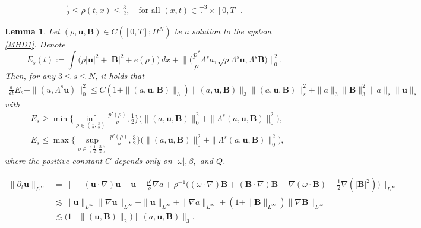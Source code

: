 \documentclass[10pt,a4paper]{amsart}
\newtheorem{lemma}{Lemma}
\def\b{ \mathbf{B} }
\def\u{ \mathbf{u} }
\begin{document}
\begin{equation}\begin{split}\label{pri-2}
		\frac{1}{2}\le \rho(t,x) \le \frac32, \quad \text{for all } (x,t)\in\mathbb T^3\times[0,T].
\end{split}\end{equation}

\begin{lemma}\label{lemma-pri1}
Let $(\rho,\u,\b) \in C([0, T];H^N)$ be a solution to the  system \eqref{MHD1}. Denote
$$E_s(t):=\int\Big(\rho|\u|^2+|\b|^2+e(\rho)\Big)\,dx+\Big\|\big(\frac{p'}{\rho}\Lambda^sa,\sqrt{\rho}\Lambda^s\u,\Lambda^s\b\big)\Big\|^2_0.$$ Then, for any $3\leq s\leq N$, it holds that
\begin{align}\label{pri-2-2}
\frac{d}{dt}E_s+
\|(u,\Lambda^s\u)\|_0^2\leq C(1+\|(a,\u,\b)\|_3)\|(a,\u,\b)\|_3\|(a,\u,\b)\|^2_s+
\|a\|_3\|\b\|^{2}_3\|a\|_s\|\u\|_s
\end{align}
with
\begin{equation}
\begin{split}\label{bu-2026-6-27-1}& E_s\geq\min\{\inf_{\rho\in(\frac12,\frac32)}\frac{p'(\rho)}{\rho},\frac12\}\big(\|(a,\u,\b)\|^2_0+\|\Lambda^s(a,\u,\b)\|^2_0\big),\\&E_s\leq\max\{\sup_{\rho\in(\frac12,\frac32)}\frac{p'(\rho)}{\rho},\frac32\}\big(\|(a,\u,\b)\|^2_0+\|\Lambda^s(a,\u,\b)\|^2_0\big),\end{split}\end{equation}
where the positive constant $C$ depends only on $|\omega|,\beta,$ and $Q$.
\end{lemma}

\begin{equation}\begin{split}\label{pri-5}
\|\partial_t\u\|_{L^\infty}&=\Big\|-(\u\cdot\nabla)\u-\u-\frac{p'}{\rho}\nabla a+\rho^{-1}\big((\omega\cdot \nabla) \b+(\b\cdot \nabla) \b-\nabla(\omega\cdot \b)-\frac12\nabla(|\b|^2)\big)\Big\|_{L^\infty}\\
&\lesssim\|\u\|_{L^\infty}\|\nabla\u\|_{L^\infty}+\|\u\|_{L^\infty}+\|\nabla a\|_{L^\infty}+(1+\|\b\|_{L^\infty})\|\nabla\b\|_{L^\infty}\\
&\lesssim\big(1+\|(\u,\b)\|_{2}\big)\|(a,\u,\b)\|_3.
\end{split}\end{equation}
\end{document}
